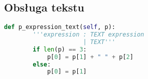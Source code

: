 \subsection{Obsługa tekstu}

\begin{lstlisting}[language={Python}, caption={Tekst}, label={gramatyka-tekst}]
    def p_expression_text(self, p):
        '''expression : TEXT expression
                      | TEXT'''
        if len(p) == 3:
            p[0] = p[1] + " " + p[2]
        else:
            p[0] = p[1]
\end{lstlisting}